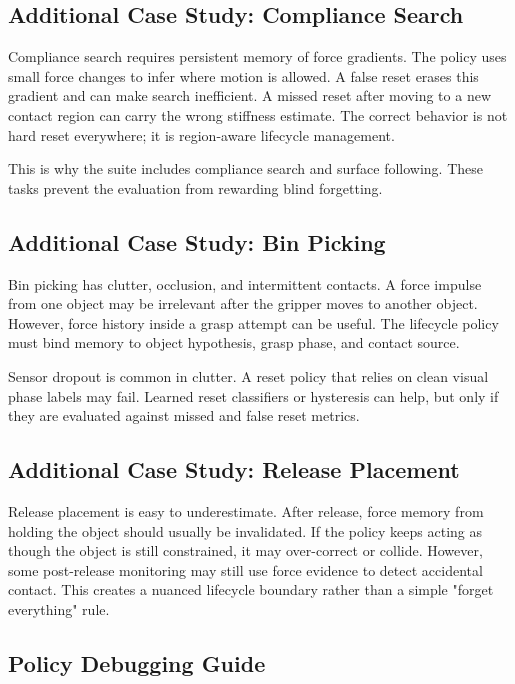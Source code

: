 \documentclass{article}
\begin{document}
\subsection{Additional Case Study: Compliance Search}

Compliance search requires persistent memory of force gradients. The policy
uses small force changes to infer where motion is allowed. A false reset erases
this gradient and can make search inefficient. A missed reset after moving to a
new contact region can carry the wrong stiffness estimate. The correct behavior
is not hard reset everywhere; it is region-aware lifecycle management.

This is why the suite includes compliance search and surface following. These
tasks prevent the evaluation from rewarding blind forgetting.

\subsection{Additional Case Study: Bin Picking}

Bin picking has clutter, occlusion, and intermittent contacts. A force impulse
from one object may be irrelevant after the gripper moves to another object.
However, force history inside a grasp attempt can be useful. The lifecycle
policy must bind memory to object hypothesis, grasp phase, and contact source.

Sensor dropout is common in clutter. A reset policy that relies on clean visual
phase labels may fail. Learned reset classifiers or hysteresis can help, but
only if they are evaluated against missed and false reset metrics.

\subsection{Additional Case Study: Release Placement}

Release placement is easy to underestimate. After release, force memory from
holding the object should usually be invalidated. If the policy keeps acting as
though the object is still constrained, it may over-correct or collide. However,
some post-release monitoring may still use force evidence to detect accidental
contact. This creates a nuanced lifecycle boundary rather than a simple "forget
everything" rule.

\subsection{Policy Debugging Guide}
\end{document}
